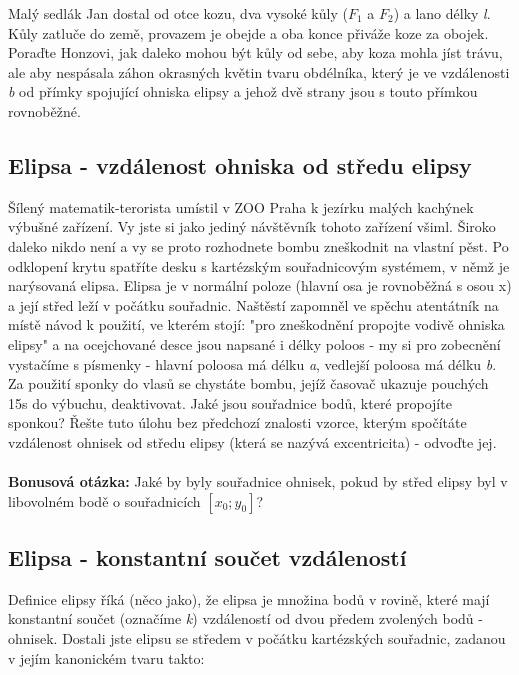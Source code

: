\documentclass[a4paper,12pt]{article}
\begin{document}
Malý sedlák Jan dostal od otce kozu, dva vysoké kůly ($ F_1$ a $F_2 $) a lano délky \textit{l}. Kůly zatluče do země, provazem je obejde a oba konce přiváže koze za obojek. Poraďte Honzovi, jak daleko mohou být kůly od sebe, aby koza mohla jíst trávu, ale aby nespásala záhon okrasných květin tvaru obdélníka, který je ve vzdálenosti \textit{b} od přímky spojující ohniska elipsy a jehož dvě strany jsou s touto přímkou rovnoběžné.	
 
\subsection{Elipsa - vzdálenost ohniska od středu elipsy}
 
Šílený matematik-terorista umístil v ZOO Praha k jezírku malých kachýnek výbušné zařízení. Vy jste si jako jediný návštěvník tohoto zařízení všiml. Široko daleko nikdo není a vy se proto rozhodnete bombu zneškodnit na vlastní pěst. Po odklopení krytu spatříte desku s kartézským souřadnicovým systémem, v němž je narýsovaná elipsa. Elipsa je v normální poloze (hlavní osa je rovnoběžná s osou x) a její střed leží v počátku souřadnic. Naštěstí zapomněl ve spěchu atentátník na místě návod k použití, ve kterém stojí: "pro zneškodnění propojte vodivě ohniska elipsy" a na ocejchované desce jsou napsané i délky poloos - my si pro zobecnění vystačíme s písmenky - hlavní poloosa má délku \textit{a}, vedlejší poloosa má délku \textit{b}. Za použití sponky do vlasů se chystáte bombu, jejíž časovač ukazuje pouchých 15s do výbuchu, deaktivovat. Jaké jsou souřadnice bodů, které propojíte sponkou? Řešte tuto úlohu bez předchozí znalosti vzorce, kterým spočítáte vzdálenost ohnisek od středu elipsy (která se nazývá excentricita) - odvoďte jej.
\\ \\
\textbf{Bonusová otázka:} Jaké by byly souřadnice ohnisek, pokud by střed elipsy byl v libovolném bodě o souřadnicích $[x_0; y_0]$?

\newpage

\subsection{Elipsa - konstantní součet vzdáleností}

Definice elipsy říká (něco jako), že elipsa je množina bodů v rovině, které mají konstantní součet (označíme \textit{k}) vzdáleností od dvou předem zvolených bodů - ohnisek. Dostali jste elipsu se středem v počátku kartézských souřadnic, zadanou v jejím kanonickém tvaru takto:
\end{document}
